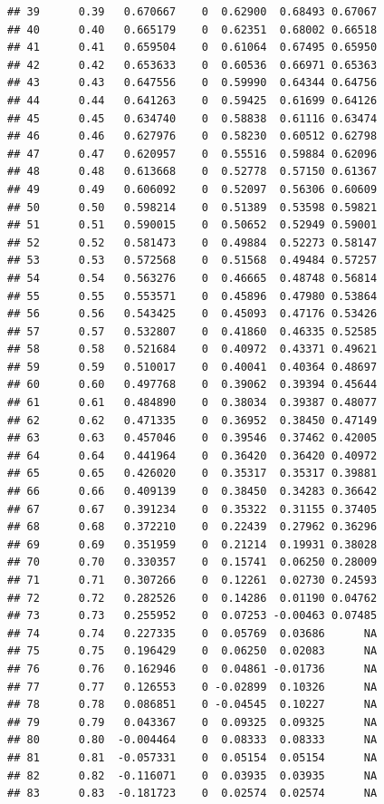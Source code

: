 \documentclass{article}\usepackage[]{graphicx}\usepackage[]{color}
\makeatletter
\newenvironment{kframe}{%
 \def\at@end@of@kframe{}%
 \ifinner\ifhmode%
  \def\at@end@of@kframe{\end{minipage}}%
  \begin{minipage}{\columnwidth}%
 \fi\fi%
 \def\FrameCommand##1{\hskip\@totalleftmargin \hskip-\fboxsep
 \colorbox{shadecolor}{##1}\hskip-\fboxsep
     \hskip-\linewidth \hskip-\@totalleftmargin \hskip\columnwidth}%
 \MakeFramed {\advance\hsize-\width
   \@totalleftmargin\z@ \linewidth\hsize
   \@setminipage}}%
 {\par\unskip\endMakeFramed%
 \at@end@of@kframe}
\newenvironment{knitrout}{}{} %
\makeatother
\begin{document}
\begin{knitrout}
\begin{kframe}
\begin{verbatim}
## 39      0.39   0.670667    0  0.62900  0.68493 0.67067
## 40      0.40   0.665179    0  0.62351  0.68002 0.66518
## 41      0.41   0.659504    0  0.61064  0.67495 0.65950
## 42      0.42   0.653633    0  0.60536  0.66971 0.65363
## 43      0.43   0.647556    0  0.59990  0.64344 0.64756
## 44      0.44   0.641263    0  0.59425  0.61699 0.64126
## 45      0.45   0.634740    0  0.58838  0.61116 0.63474
## 46      0.46   0.627976    0  0.58230  0.60512 0.62798
## 47      0.47   0.620957    0  0.55516  0.59884 0.62096
## 48      0.48   0.613668    0  0.52778  0.57150 0.61367
## 49      0.49   0.606092    0  0.52097  0.56306 0.60609
## 50      0.50   0.598214    0  0.51389  0.53598 0.59821
## 51      0.51   0.590015    0  0.50652  0.52949 0.59001
## 52      0.52   0.581473    0  0.49884  0.52273 0.58147
## 53      0.53   0.572568    0  0.51568  0.49484 0.57257
## 54      0.54   0.563276    0  0.46665  0.48748 0.56814
## 55      0.55   0.553571    0  0.45896  0.47980 0.53864
## 56      0.56   0.543425    0  0.45093  0.47176 0.53426
## 57      0.57   0.532807    0  0.41860  0.46335 0.52585
## 58      0.58   0.521684    0  0.40972  0.43371 0.49621
## 59      0.59   0.510017    0  0.40041  0.40364 0.48697
## 60      0.60   0.497768    0  0.39062  0.39394 0.45644
## 61      0.61   0.484890    0  0.38034  0.39387 0.48077
## 62      0.62   0.471335    0  0.36952  0.38450 0.47149
## 63      0.63   0.457046    0  0.39546  0.37462 0.42005
## 64      0.64   0.441964    0  0.36420  0.36420 0.40972
## 65      0.65   0.426020    0  0.35317  0.35317 0.39881
## 66      0.66   0.409139    0  0.38450  0.34283 0.36642
## 67      0.67   0.391234    0  0.35322  0.31155 0.37405
## 68      0.68   0.372210    0  0.22439  0.27962 0.36296
## 69      0.69   0.351959    0  0.21214  0.19931 0.38028
## 70      0.70   0.330357    0  0.15741  0.06250 0.28009
## 71      0.71   0.307266    0  0.12261  0.02730 0.24593
## 72      0.72   0.282526    0  0.14286  0.01190 0.04762
## 73      0.73   0.255952    0  0.07253 -0.00463 0.07485
## 74      0.74   0.227335    0  0.05769  0.03686      NA
## 75      0.75   0.196429    0  0.06250  0.02083      NA
## 76      0.76   0.162946    0  0.04861 -0.01736      NA
## 77      0.77   0.126553    0 -0.02899  0.10326      NA
## 78      0.78   0.086851    0 -0.04545  0.10227      NA
## 79      0.79   0.043367    0  0.09325  0.09325      NA
## 80      0.80  -0.004464    0  0.08333  0.08333      NA
## 81      0.81  -0.057331    0  0.05154  0.05154      NA
## 82      0.82  -0.116071    0  0.03935  0.03935      NA
## 83      0.83  -0.181723    0  0.02574  0.02574      NA

\end{verbatim}
\end{kframe}
\end{knitrout}
\end{document}
